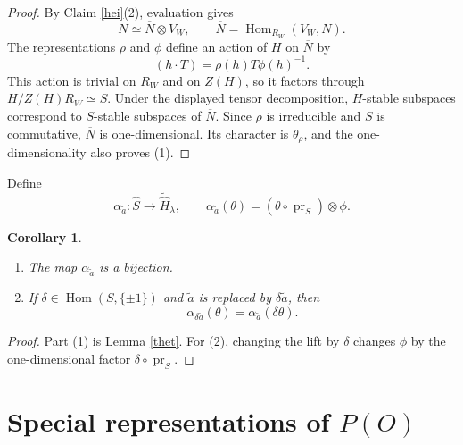 \documentclass[11pt,a4paper,twoside]{amsart}
\newtheorem{corollary}[theorem]{Corollary}
\theoremstyle{definition}
\theoremstyle{remark}
\newcommand{\bl}{\lambda}
\newcommand{\Hom}{\operatorname{Hom}}
\begin{document}
\begin{proof}
By Claim \ref{hei}(2), evaluation gives
$$
N\simeq\overline N\otimes V_W,
\qquad \overline N=\Hom_{R_W}(V_W,N).
$$
The representations $\rho$ and $\phi$ define an action of $H$ on $\overline N$ by
$$
(h\cdot T)=\rho(h)T\phi(h)^{-1}.
$$
This action is trivial on $R_W$ and on $Z(H)$, so it factors through $H/Z(H)R_W\simeq S$. Under the displayed tensor decomposition, $H$-stable subspaces correspond to $S$-stable subspaces of $\overline N$. Since $\rho$ is irreducible and $S$ is commutative, $\overline N$ is one-dimensional. Its character is $\theta_\rho$, and the one-dimensionality also proves (1).
\end{proof}
Define
$$
\alpha_{\widetilde a}:\widehat S\longrightarrow\widetilde{\widehat H}_\bl,
\qquad
\alpha_{\widetilde a}(\theta)=(\theta\circ\operatorname{pr}_S)\otimes\phi.
$$
\begin{corollary}\label{alpha}
\begin{enumerate}
\item The map $\alpha_{\widetilde a}$ is a bijection.
\item If $\delta\in\Hom(S,\{\pm1\})$ and $\widetilde a$ is replaced by $\delta\widetilde a$, then
$$
\alpha_{\delta\widetilde a}(\theta)=\alpha_{\widetilde a}(\delta\theta).
$$
\end{enumerate}
\end{corollary}
\begin{proof}
Part (1) is Lemma \ref{thet}. For (2), changing the lift by $\delta$ changes $\phi$ by the one-dimensional factor $\delta\circ\operatorname{pr}_S$.
\end{proof}
\section{Special representations of $P(O)$}\label{PO}
\end{document}
